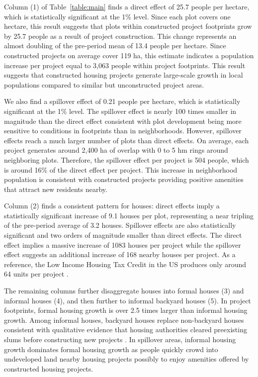 \documentclass[12pt]{article}
\begin{document}
Column (1) of Table~\ref{table:main}  finds a direct effect of 25.7 people per hectare, which is statistically significant at the 1\% level.  Since each plot covers one hectare, this result suggests that plots within constructed project footprints grow by 25.7 people as a result of project construction.  This change represents an almost doubling of the pre-period mean of 13.4 people per hectare.  Since constructed projects on average cover 119 ha, this estimate indicates a population increase per project equal to 3,063 people within project footprints.  This result suggests that constructed housing projects generate large-scale growth in local populations compared to similar but unconstructed project areas.

We also find a spillover effect of 0.21 people per hectare, which is statistically significant at the 1\% level.  The spillover effect is nearly 100 times smaller in magnitude than the direct effect consistent with plot development being more sensitive to conditions in footprints than in neighborhoods.  However, spillover effects reach a much larger number of plots than direct effects.  On average, each project generates around 2,400 ha of overlap with 0 to 5 hm rings around neighboring plots.  Therefore, the spillover effect per project is 504 people, which is around 16\% of the direct effect per project.  This increase in neighborhood population is consistent with constructed projects providing positive amenities that attract new residents nearby.

Column (2) finds a consistent pattern for houses: direct effects imply a statistically significant increase of 9.1 houses per plot, representing a near tripling of the pre-period average of 3.2 houses.  Spillover effects are also statistically significant and two orders of magnitude smaller than direct effects.  The direct effect implies a massive increase of 1083 houses per project while the spillover effect suggests an additional increase of 168 nearby houses per project.  As a reference, the Low Income Housing Tax Credit in the US produces only around 64 units per project \citep{diamond2016wants}.

The remaining columns further disaggregate houses into formal houses (3) and informal houses (4), and then further to informal backyard houses (5).  In project footprints, formal housing growth is over 2.5 times larger than informal housing growth.  Among informal houses, backyard houses replace non-backyard houses consistent with qualitative evidence that housing authorities cleared preexisting slums before constructing new projects \citep{hofmeyr2008risk}.  In spillover areas, informal housing growth dominates formal housing growth as people quickly crowd into undeveloped land nearby housing projects possibly to enjoy amenities offered by constructed housing projects.
\end{document}
